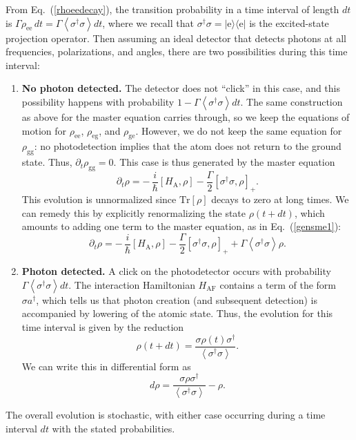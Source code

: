 \documentclass[12pt,aps,onecolum,superscriptaddress,footinbib,floatfix,showpacs]{revtex4-1}
\def\ket#1{|{#1}\rangle}
\def\bra#1{\langle{#1}|}
\def\expct#1{\!\left\langle{#1}\right\rangle}
\def\HAF{H_\mathrm{\scriptscriptstyle AF}}
\def\HA{H_\mathrm{\scriptscriptstyle A}}
\begin{document}
\relax From Eq.~(\ref{rhoeedecay}), the transition probability in a time
interval of length $dt$ is $\Gamma\rho_\mathrm{ee}\,dt=\Gamma\expct{\sigma^\dagger\sigma}dt$,
where we recall that $\sigma^\dagger\sigma =\ket{\mathrm{e}}\bra{\mathrm{e}}$ is the
excited-state projection operator.
Then assuming an ideal detector that detects photons at all frequencies,
polarizations, and angles, there are two possibilities during this time interval:
\begin{enumerate}
\item \textbf{No photon detected.} The detector does not ``click'' in this
case, and this possibility happens with probability 
$1-\Gamma\expct{\sigma^\dagger\sigma}dt$.  The same construction 
as above for the master equation carries through, so we keep
the equations of motion for $\rho_\mathrm{ee}$, $\rho_\mathrm{eg}$,
and $\rho_\mathrm{ge}$.  However, we do not keep the same equation
for $\rho_\mathrm{gg}$: no photodetection implies that the atom
does not return to the ground state.  Thus, $\partial_t \rho_\mathrm{gg}=0$.
This case is thus generated by the master equation
\begin{equation}
  \partial_t\rho =-\,\frac{i}{\hbar}[\HA,\rho]-\frac{\Gamma}{2}[\sigma^\dagger\sigma,\rho]_+ .
\end{equation}
This evolution is unnormalized since $\mathrm{Tr}[\rho]$ decays to zero at long times.
We can remedy this by explicitly renormalizing the state $\rho(t+dt)$,
which amounts to adding one 
term to the master equation, as in Eq.~(\ref{gensme1}):
\begin{equation}
  \partial_t\rho =-\,\frac{i}{\hbar}[\HA,\rho]-\frac{\Gamma}{2}[\sigma^\dagger\sigma,\rho]_+ 
    +\Gamma\expct{\sigma^\dagger\sigma}\rho.
\end{equation}


\item \textbf{Photon detected.}  A click on the photodetector
occurs with probability 
$\Gamma\expct{\sigma^\dagger\sigma}dt$.
The interaction Hamiltonian $\HAF$ contains a term of the form $\sigma a^\dagger$,
which tells us that photon creation (and subsequent detection) 
is accompanied by lowering of the atomic state.
Thus, the evolution for this time interval is given by the reduction
\begin{equation}
  \rho(t+dt) = \frac{\sigma\rho(t)\sigma^\dagger}{\expct{\sigma^\dagger\sigma}}.
\end{equation}
We can write this in differential form as
\begin{equation}
  d\rho = \frac{\sigma\rho\sigma^\dagger}{\expct{\sigma^\dagger\sigma}}-\rho.
\end{equation}

\end{enumerate}
The overall evolution is stochastic, with either case occurring during a
time interval $dt$ with the stated probabilities. 
 
\end{document}
